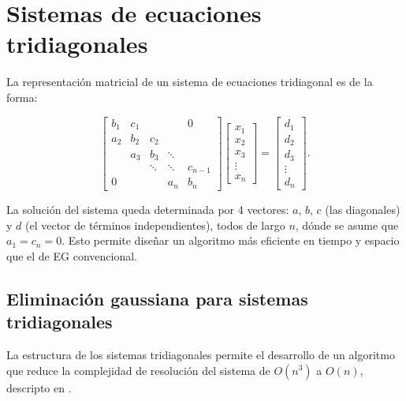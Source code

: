 \section{Sistemas de ecuaciones tridiagonales}
\label{EG_tridiagonales}

La representación matricial de un sistema de ecuaciones tridiagonal es de la forma:
 
\begin{equation}
\begin{bmatrix}
   b_1 & c_1 &        &        &  0      \\
   a_2 & b_2 & c_2    &        &         \\
       & a_3 & b_3    & \ddots &         \\
       &     & \ddots & \ddots & c_{n-1} \\
   0   &     &        & a_n    & b_n
\end{bmatrix}
\begin{bmatrix}
   x_1    \\
   x_2    \\
   x_3    \\
   \vdots \\
   x_n
\end{bmatrix}
=
\begin{bmatrix}
   d_1    \\
   d_2    \\
   d_3    \\
   \vdots \\
   d_n
\end{bmatrix}
.
\label{eq:DEF_TRIDIAGONAL}
\end{equation}

La solución del sistema queda determinada por 4 vectores:  $a$, $b$, $c$ (las diagonales) y $d$ (el vector de términos independientes), todos de largo $n$, d\'onde se asume que $a_{1} = c_{n} = 0$. Esto permite diseñar un algoritmo más eficiente en tiempo y espacio que el de EG convencional.

\subsection{Eliminaci\'on gaussiana para sistemas tridiagonales}
\label{EG_tridiagonales_sin_precomputo}

La estructura de los sistemas tridiagonales permite el desarrollo de un algoritmo que reduce la complejidad de resoluci\'on del sistema de $O(n^{3})$ a $O(n)$, descripto en . 

